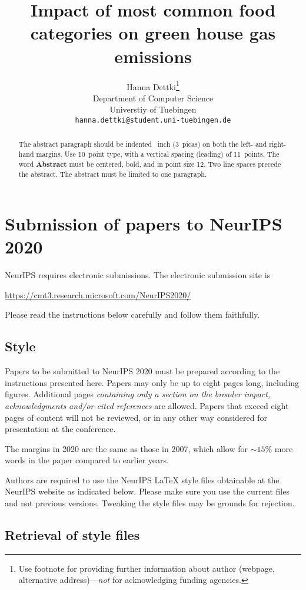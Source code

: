 \documentclass{article}
\title{Impact of most common food categories on green house gas emissions}
\author{%
  Hanna Dettki\thanks{Use footnote for providing further information
    about author (webpage, alternative address)---\emph{not} for acknowledging
    funding agencies.} \\
  Department of Computer Science\\
  Universtiy of Tuebingen\\

  \texttt{hanna.dettki@student.uni-tuebingen.de} \\
}
\begin{document}
\maketitle

\begin{abstract}
  The abstract paragraph should be indented ~inch (3~picas) on
  both the left- and right-hand margins. Use 10~point type, with a vertical
  spacing (leading) of 11~points.  The word \textbf{Abstract} must be centered,
  bold, and in point size 12. Two line spaces precede the abstract. The abstract
  must be limited to one paragraph.
\end{abstract}

\section{Submission of papers to NeurIPS 2020}

NeurIPS requires electronic submissions.  The electronic submission site is
\begin{center}
  \url{https://cmt3.research.microsoft.com/NeurIPS2020/}
\end{center}

Please read the instructions below carefully and follow them faithfully.

\subsection{Style}

Papers to be submitted to NeurIPS 2020 must be prepared according to the
instructions presented here. Papers may only be up to eight pages long,
including figures. Additional pages \emph{containing only a section on the broader impact, acknowledgments and/or cited references} are allowed. Papers that exceed eight pages of content will not be reviewed, or in any other way considered for
presentation at the conference.

The margins in 2020 are the same as those in 2007, which allow for $\sim$$15\%$
more words in the paper compared to earlier years.

Authors are required to use the NeurIPS \LaTeX{} style files obtainable at the
NeurIPS website as indicated below. Please make sure you use the current files
and not previous versions. Tweaking the style files may be grounds for
rejection.

\subsection{Retrieval of style files}
\end{document}
